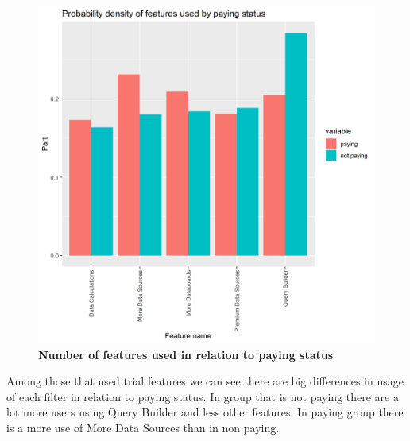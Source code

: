 \documentclass[fleqn,moreauthors,10pt]{ds_report}
\begin{document}
\begin{figure}\centering
	\includegraphics[width=\linewidth]{density_features.png}
	\caption{\textbf{Number of features used in relation to paying status}   }
	\label{fig:trial_features}
\end{figure}
Among those that used trial features we can see there are big differences in usage of each filter in relation to paying status. In group that is not paying there are a lot more users using Query Builder and less other features. In paying group there is a more use of More Data Sources than in non paying.
\end{document}
